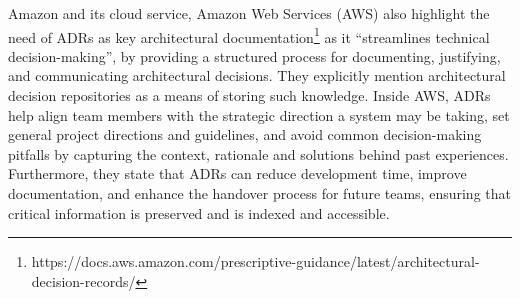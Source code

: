         Amazon and its cloud service, Amazon Web Services (AWS) also highlight the need of ADRs as key architectural documentation\footnote{https://docs.aws.amazon.com/prescriptive-guidance/latest/architectural-decision-records/} as it ``streamlines technical decision-making'', by providing a structured process for documenting, justifying, and communicating architectural decisions. They explicitly mention architectural decision repositories as a means of storing such knowledge. Inside AWS, ADRs help align team members with the strategic direction a system may be taking, set general project directions and guidelines, and avoid common decision-making pitfalls by capturing the context, rationale and solutions behind past experiences. Furthermore, they state that ADRs can reduce development time, improve documentation, and enhance the handover process for future teams, ensuring that critical information is preserved and is indexed and accessible. 